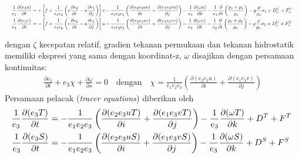 \begin{spacing}{1.5}
\begin{equation*}
		\resizebox{\textwidth}{!}{%
			$
			\begin{aligned}
				\frac{1}{e_3}\frac{\partial (e_3u)}{\partial t} &= +\left[f+\frac{1}{e_1e_2}\left(v\frac{\partial e_2}{\partial i} - u\frac{\partial e_1}{\partial j}\right) \right]v -  
				\frac{1}{e_1e_2e_3}\left(\frac{\partial (e_2e_3uu)}{\partial i} + \frac{\partial (e_1e_3vu)}{\partial j}\right) -
				\frac{1}{e_3}\frac{\partial (\omega u)}{\partial k} - \frac{1}{e_1}\frac{\partial}{\partial i}\left(\frac{p_s+p_h}{\rho_o}\right)-g\frac{\rho}{\rho_o}\sigma_1+D^U_u+F^U_u  \\
				\frac{1}{e_3}\frac{\partial (e_3v)}{\partial t} &= -\left[f+\frac{1}{e_1e_2}\left(v\frac{\partial e_2}{\partial i} - u\frac{\partial e_1}{\partial j}\right) \right]u -  
				\frac{1}{e_1e_2e_3}\left(\frac{\partial (e_2e_3uv)}{\partial i} + \frac{\partial (e_1e_3vv)}{\partial j}\right) -
				\frac{1}{e_3}\frac{\partial (\omega v)}{\partial k} - \frac{1}{e_2}\frac{\partial}{\partial i}\left(\frac{p_s+p_h}{\rho_o}\right)-g\frac{\rho}{\rho_o}\sigma_2+D^U_v+F^U_v%
			\end{aligned}
			$
		}
	\end{equation*}
	
	dengan $\zeta$ kecepatan relatif, gradien tekanan permukaan dan tekanan hidrostatik memiliki ekspresi yang sama dengan koordinat-z, $\omega$ disajikan dengan persamaan kontinuitas:
	\begin{equation*}
		\begin{aligned}
			\frac{\partial e_3}{\partial t}+e_3\chi+\frac{\partial \omega}{\partial s}=0 \quad \text{dengan}\quad \chi=\frac{1}{e_1e_2e_3}\left(\frac{\partial (e_2e_3u)}{\partial i}+\frac{\partial (e_1e_3v)}{\partial j}\right)
		\end{aligned}
	\end{equation*}
	Persamaan pelacak (\textit{tracer equations}) diberikan oleh
	\begin{equation*}
		\resizebox{\textwidth}{!}{%
			$
			\begin{aligned}
				\frac{1}{e_3}\frac{\partial (e_3T)}{\partial t} &= -  
				\frac{1}{e_1e_2e_3}\left(\frac{\partial (e_2e_3uT)}{\partial i} + \frac{\partial (e_1e_3vT)}{\partial j}\right) -
				\frac{1}{e_3}\frac{\partial (\omega T)}{\partial k}+D^T+F^T  \\
				\frac{1}{e_3}\frac{\partial (e_3S)}{\partial t} &= -  
				\frac{1}{e_1e_2e_3}\left(\frac{\partial (e_2e_3uS)}{\partial i} + \frac{\partial (e_1e_3vS)}{\partial j}\right) -
				\frac{1}{e_3}\frac{\partial (\omega S)}{\partial k}+D^S+F^S%
			\end{aligned}
			$
		}
	\end{equation*}
	
\end{spacing}
\vspace{-0.1pc}
